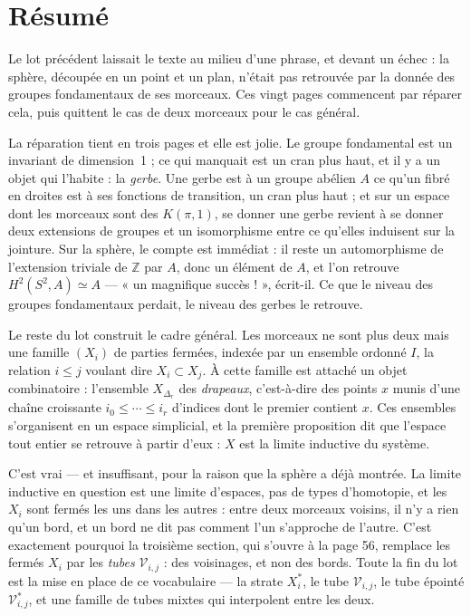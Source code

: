 \documentclass[11pt,a4paper]{article}
\begin{document}
\section*{Résumé}

\begin{resume}
Le lot précédent laissait le texte au milieu d'une phrase, et devant un échec :
la sphère, découpée en un point et un plan, n'était pas retrouvée par la donnée
des groupes fondamentaux de ses morceaux. Ces vingt pages commencent par
réparer cela, puis quittent le cas de deux morceaux pour le cas général.

La réparation tient en trois pages et elle est jolie. Le groupe fondamental est
un invariant de dimension~1 ; ce qui manquait est un cran plus haut, et il y a
un objet qui l'habite : la \emph{gerbe}. Une gerbe est à un groupe abélien $A$
ce qu'un fibré en droites est à ses fonctions de transition, un cran plus haut ;
et sur un espace dont les morceaux sont des $K(\pi,1)$, se donner une gerbe
revient à se donner deux extensions de groupes et un isomorphisme entre ce
qu'elles induisent sur la jointure. Sur la sphère, le compte est immédiat : il
reste un automorphisme de l'extension triviale de $\mathbb{Z}$ par $A$, donc un
élément de $A$, et l'on retrouve $H^{2}(S^{2},A) \simeq A$ — « un magnifique
succès ! », écrit-il. Ce que le niveau des groupes fondamentaux perdait, le
niveau des gerbes le retrouve.

Le reste du lot construit le cadre général. Les morceaux ne sont plus deux mais
une famille $(X_{i})$ de parties fermées, indexée par un ensemble ordonné $I$,
la relation $i \leq j$ voulant dire $X_{i} \subset X_{j}$. À cette famille est
attaché un objet combinatoire : l'ensemble $X_{\Delta_{r}}$ des \emph{drapeaux},
c'est-à-dire des points $x$ munis d'une chaîne croissante $i_{0} \leq \cdots \leq
i_{r}$ d'indices dont le premier contient $x$. Ces ensembles s'organisent en un
espace simplicial, et la première proposition dit que l'espace tout entier se
retrouve à partir d'eux : $X$ est la limite inductive du système.

C'est vrai — et insuffisant, pour la raison que la sphère a déjà montrée. La
limite inductive en question est une limite d'espaces, pas de types d'homotopie,
et les $X_{i}$ sont fermés les uns dans les autres : entre deux morceaux
voisins, il n'y a rien qu'un bord, et un bord ne dit pas comment l'un s'approche
de l'autre. C'est exactement pourquoi la troisième section, qui s'ouvre à la page
56, remplace les fermés $X_{i}$ par les \emph{tubes} $\mathcal{V}_{i,j}$ : des
voisinages, et non des bords. Toute la fin du lot est la mise en place de ce
vocabulaire — la strate $X_{i}^{*}$, le tube $\mathcal{V}_{i,j}$, le tube épointé
$\mathcal{V}^{*}_{i,j}$, et une famille de tubes mixtes qui interpolent entre les
deux.


\end{resume}
\end{document}
